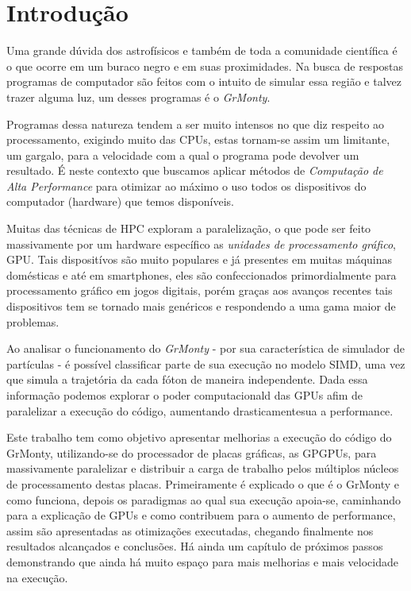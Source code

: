 \chapter{Introdução}
\label{cap:introducao}

Uma grande dúvida dos astrofísicos e também de toda a comunidade científica é o que ocorre em um buraco negro e em suas proximidades. Na busca de respostas programas de computador são feitos com o intuito de simular essa região e talvez trazer alguma luz, um desses programas é o \emph{GrMonty}\citep{Dolence:09}.

Programas dessa natureza tendem a ser muito intensos no que diz respeito ao processamento, exigindo muito das CPUs, estas tornam-se assim um limitante, um gargalo, para a velocidade com a qual o programa pode devolver um resultado. É neste contexto que buscamos aplicar métodos de \emph{Computação de Alta Performance} para otimizar ao máximo o uso todos os dispositivos do computador (hardware) que temos disponíveis.

Muitas das técnicas de HPC exploram a paralelização, o que pode ser feito massivamente por um hardware específico as \emph{unidades de processamento gráfico}, GPU. Tais dispositívos são muito populares e já presentes em muitas máquinas domésticas e até em smartphones, eles são confeccionados primordialmente para processamento gráfico em jogos digitais, porém graças aos avanços recentes tais dispositivos tem se tornado mais genéricos e respondendo a uma gama maior de problemas.

Ao analisar o funcionamento do \emph{GrMonty} - por sua característica de simulador de partículas - é possível classificar parte de sua execução no modelo SIMD, uma vez que simula a trajetória da cada fóton de maneira independente. Dada essa informação podemos explorar o poder computacionald das GPUs afim de paralelizar a execução do código, aumentando drasticamentesua a performance.

Este trabalho tem como objetivo apresentar melhorias a execução do código do GrMonty, utilizando-se do processador de placas gráficas, as GPGPUs, para massivamente paralelizar e distribuir a carga de trabalho pelos múltiplos núcleos de processamento destas placas. Primeiramente é explicado o que é o GrMonty e como funciona, depois os paradigmas ao qual sua execução apoia-se, caminhando para a explicação de GPUs e como contribuem para o aumento de performance, assim são apresentadas as otimizações executadas, chegando finalmente nos resultados alcançados e conclusões. Há ainda um capítulo de próximos passos demonstrando que ainda há muito espaço para mais melhorias e mais velocidade na execução.

